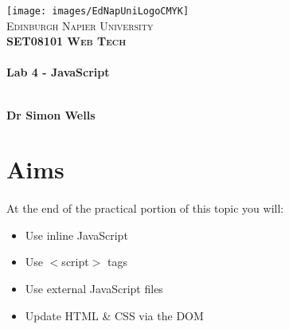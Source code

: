 \documentclass[10pt, a4paper, twosize]{article}
\begin{document}

\begin{titlepage}
\vspace*{5cm}
\begin{center}
\texttt{[image: images/EdNapUniLogoCMYK]}~\\[1cm]

\textsc{\Large Edinburgh Napier University}\\[1.5cm]

\textsc{\LARGE \bfseries SET08101 Web Tech}\\[0.5cm]

\hrulefill \\[0.4cm]
{\huge \bfseries Lab 4 - JavaScript \\[0.4cm] }
\hrulefill \\[1.5cm]

\begin{minipage}{0.4\textwidth}
\begin{flushleft} \large
\textbf{Dr Simon Wells} \\
\end{flushleft}
\end{minipage}

\vfill

\end{center}
\end{titlepage}




%

\section{Aims}
\paragraph{} At the end of the practical portion of this topic you will:

\begin{itemize}
\item Use inline JavaScript
\item Use $<$script$>$ tags
\item Use external JavaScript files
\item Update HTML \& CSS via the DOM
\end{itemize}
\end{document}
